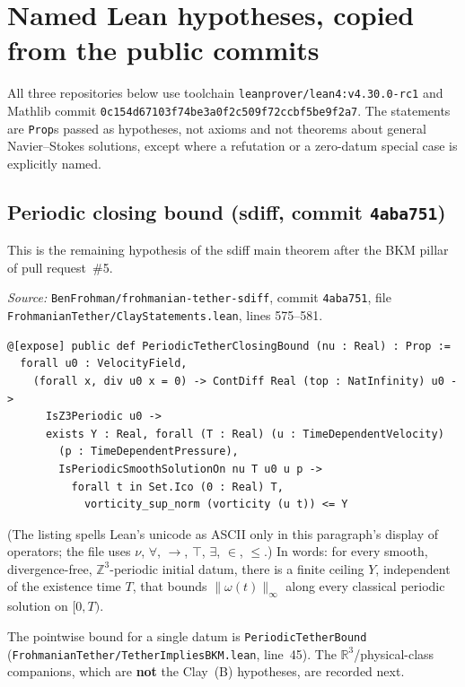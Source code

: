 \documentclass[11pt]{article}
\theoremstyle{plain}
\theoremstyle{definition}
\theoremstyle{remark}
\newcommand{\R}{\mathbb{R}}
\begin{document}
\section{Named Lean hypotheses, copied from the public commits}

All three repositories below use toolchain \texttt{leanprover/\hspace{0pt}lean4:v4.\hspace{0pt}30.\hspace{0pt}0-rc1} and Mathlib commit \texttt{0c154d67103f74be3a0f2c509f72ccbf5be9f2a7}. The statements are \texttt{Prop}s passed as hypotheses, not axioms and not theorems about general Navier--Stokes solutions, except where a refutation or a zero-datum special case is explicitly named.

\subsection{Periodic closing bound (sdiff, commit \texttt{4aba751})}

This is the remaining hypothesis of the sdiff main theorem after the BKM pillar of pull request~\#5.

\textit{Source:} \texttt{BenFrohman/\hspace{0pt}frohmanian-tether-sdiff}, commit \texttt{4aba751}, file \texttt{FrohmanianTether/\hspace{0pt}ClayStatements.\hspace{0pt}lean}, lines 575--581.
\begin{lstlisting}
@[expose] public def PeriodicTetherClosingBound (nu : Real) : Prop :=
  forall u0 : VelocityField,
    (forall x, div u0 x = 0) -> ContDiff Real (top : NatInfinity) u0 ->
      IsZ3Periodic u0 ->
      exists Y : Real, forall (T : Real) (u : TimeDependentVelocity)
        (p : TimeDependentPressure),
        IsPeriodicSmoothSolutionOn nu T u0 u p ->
          forall t in Set.Ico (0 : Real) T,
            vorticity_sup_norm (vorticity (u t)) <= Y
\end{lstlisting}
(The listing spells Lean's unicode as ASCII only in this paragraph's display of operators; the file uses \(\nu\), \(\forall\), \(\to\), \(\top\), \(\exists\), \(\in\), \(\le\).) In words: for every smooth, divergence-free, \(\mathbb{Z}^{3}\)-periodic initial datum, there is a finite ceiling \(Y\), independent of the existence time \(T\), that bounds \(\|\omega(t)\|_{\infty}\) along every classical periodic solution on \([0,T)\).

The pointwise bound for a single datum is \texttt{PeriodicTetherBound} (\texttt{FrohmanianTether/\hspace{0pt}TetherImpliesBKM.\hspace{0pt}lean}, line~45). The \(\R^{3}\)/physical-class companions, which are \textbf{not} the Clay~(B) hypotheses, are recorded next.
\end{document}
